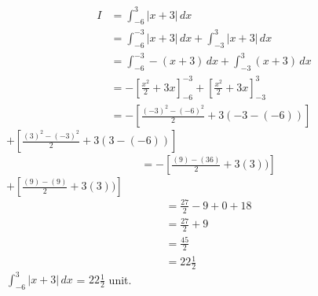 \documentclass[12pt]{IEEEtran}
\begin{document}
    
    \begin{align}
        I&=\int_{-6}^{3} |x+3| \,dx \\
        &= \int_{-6}^{-3} |x+3| \,dx  +  \int_{-3}^{3} |x+3| \,dx \\
        &= \int_{-6}^{-3} -(x+3) \,dx  +  \int_{-3}^{3} (x+3) \,dx \\
        &= -\left[\frac{x^2}{2}+3x\right]_{-6}^{-3} + \left[\frac{x^2}{2}+3x\right]_{-3}^{3}\\
        &=-\left[\frac{(-3)^2-(-6)^2}{2}+3(-3-(-6))\right]
    \end{align}
    $+\left[\frac{(3)^2-(-3)^2}{2} +3(3-(-6))\right]$
    \begin{align}
        &=-\left[\frac{(9)-(36)}{2} +3(3))\right]
    \end{align}
    $+\left[\frac{(9)-(9)}{2} +3(3))\right]$
    \begin{align}
        &=\frac{27}{2}-9+0+18\\
        &=\frac{27}{2}+9\\
        &=\frac{45}{2}\\
        &=22\frac{1}{2}
    \end{align}
    \implies $ \int_{-6}^{3} |x+3| \,dx $ = $22\frac{1}{2}$ unit.\\
    
\end{document}
